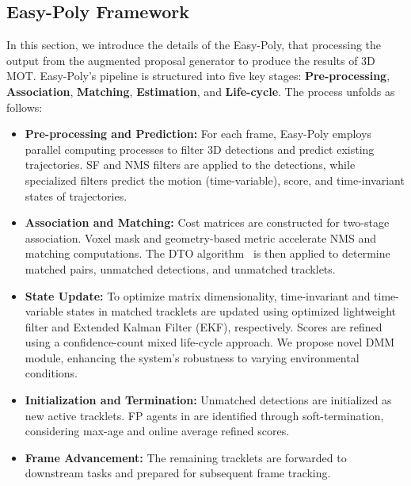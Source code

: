 \subsection{Easy-Poly Framework}
In this section, we introduce the details of the Easy-Poly, that processing the output from the augmented proposal generator to produce the results of 3D MOT. Easy-Poly's pipeline is structured into five key stages: \textbf{Pre-processing}, \textbf{Association}, \textbf{Matching}, \textbf{Estimation}, and \textbf{Life-cycle}. The process unfolds as follows:
\begin{itemize}
\item \textbf{Pre-processing and Prediction:} For each frame, Easy-Poly employs parallel computing processes to filter 3D detections and predict existing trajectories. SF and NMS filters are applied to the detections, while specialized filters predict the motion (time-variable), score, and time-invariant states of trajectories.
\item \textbf{Association and Matching:} Cost matrices are constructed for two-stage association. Voxel mask and geometry-based metric accelerate NMS and matching computations. The DTO  algorithm~\cite{kuhn1955hungarian} is then applied to determine matched pairs, unmatched detections, and unmatched tracklets.
\item \textbf{State Update:} To optimize matrix dimensionality, time-invariant and time-variable states in matched tracklets are updated using optimized lightweight filter and Extended Kalman Filter (EKF), respectively. Scores are refined using a confidence-count mixed life-cycle approach. We propose novel DMM module, enhancing the system's robustness to varying environmental conditions.
\item \textbf{Initialization and Termination:} Unmatched detections are initialized as new active tracklets. FP agents in are identified through soft-termination, considering max-age and online average refined scores.
\item \textbf{Frame Advancement:} The remaining tracklets are forwarded to downstream tasks and prepared for subsequent frame tracking.
\end{itemize}

